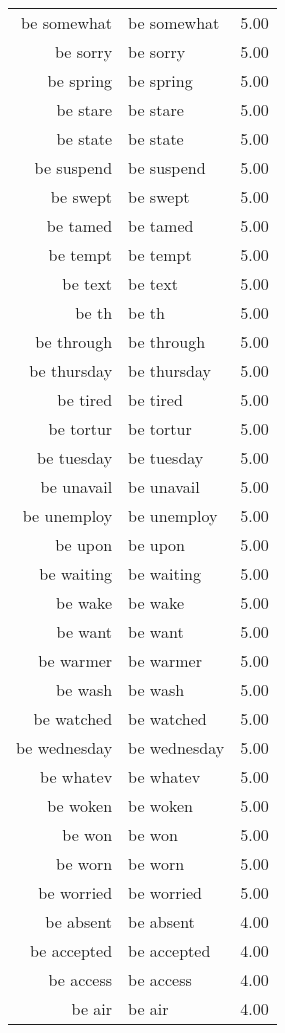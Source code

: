 \begin{table}[ht]
\begin{tabular}{rlr}
  be somewhat & be somewhat & 5.00 \\ 
  be sorry & be sorry & 5.00 \\ 
  be spring & be spring & 5.00 \\ 
  be stare & be stare & 5.00 \\ 
  be state & be state & 5.00 \\ 
  be suspend & be suspend & 5.00 \\ 
  be swept & be swept & 5.00 \\ 
  be tamed & be tamed & 5.00 \\ 
  be tempt & be tempt & 5.00 \\ 
  be text & be text & 5.00 \\ 
  be th & be th & 5.00 \\ 
  be through & be through & 5.00 \\ 
  be thursday & be thursday & 5.00 \\ 
  be tired & be tired & 5.00 \\ 
  be tortur & be tortur & 5.00 \\ 
  be tuesday & be tuesday & 5.00 \\ 
  be unavail & be unavail & 5.00 \\ 
  be unemploy & be unemploy & 5.00 \\ 
  be upon & be upon & 5.00 \\ 
  be waiting & be waiting & 5.00 \\ 
  be wake & be wake & 5.00 \\ 
  be want & be want & 5.00 \\ 
  be warmer & be warmer & 5.00 \\ 
  be wash & be wash & 5.00 \\ 
  be watched & be watched & 5.00 \\ 
  be wednesday & be wednesday & 5.00 \\ 
  be whatev & be whatev & 5.00 \\ 
  be woken & be woken & 5.00 \\ 
  be won & be won & 5.00 \\ 
  be worn & be worn & 5.00 \\ 
  be worried & be worried & 5.00 \\ 
  be absent & be absent & 4.00 \\ 
  be accepted & be accepted & 4.00 \\ 
  be access & be access & 4.00 \\ 
  be air & be air & 4.00 \\ 

\end{tabular}
\end{table}
